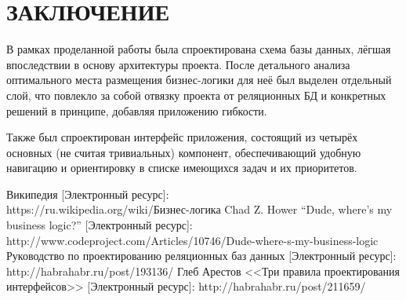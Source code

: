 \documentclass[14pt, a4paper]{extreport}
\begin{document}
\chapter{\MakeTextUppercase{Заключение}}
В рамках проделанной работы была спроектирована схема базы данных, лёгшая впоследствии в основу архитектуры проекта. После детального анализа оптимального места размещения бизнес-логики для неё был выделен отдельный слой, что повлекло за собой отвязку проекта от реляционных БД и конкретных решений в принципе, добавляя приложению гибкости.

Также был спроектирован интерфейс приложения, состоящий из четырёх основных (не считая тривиальных) компонент, обеспечивающий удобную навигацию и ориентировку в списке имеющихся задач и их приоритетов.

\begin{thebibliography}{}
\bibitem{} Википедия [Электронный ресурс]: \\https://ru.wikipedia.org/wiki/Бизнес-логика
\bibitem{} Chad Z. Hower ``Dude, where's my business logic?'' [Электронный ресурс]: http://www.codeproject.com/Articles/10746/Dude-where-s-my-business-logic
\bibitem{} Руководство по проектированию реляционных баз данных [Электронный ресурс]: http://habrahabr.ru/post/193136/
\bibitem{} Глеб Арестов <<Три правила проектирования интерфейсов>> [Электронный ресурс]: http://habrahabr.ru/post/211659/
\end{thebibliography}
\end{document}
